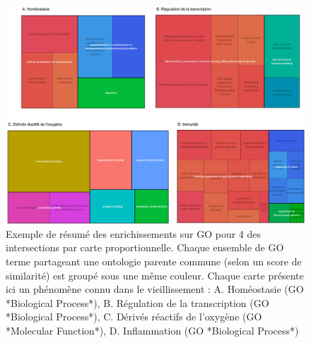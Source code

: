 
\begin{figure}
    \centering
    \includegraphics[width=1\textwidth]{img/chap2/chap2_revigo_resume_4_enrich.png}
    \caption{Exemple de résumé des enrichissements sur GO pour 4 des intersections par carte proportionnelle. Chaque ensemble de GO terme partageant une ontologie parente commune (selon un score de similarité) est groupé sous une même couleur. Chaque carte présente ici un phénomène connu dans le vieillissement : A. Homéostasie (GO *Biological Process*), B. Régulation de la transcription (GO *Biological Process*), C. Dérivés réactifs de l'oxygène (GO *Molecular Function*), D. Inflammation (GO *Biological Process*) }
    \label{figure:revigo_resume_4_enrich}
\end{figure}

